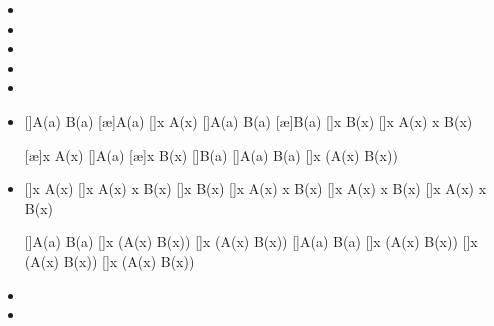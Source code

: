 \begin{itemize}
\item

\item

\item

\item

\item

\item
  \begin{prooftree*}
  [\une]{A(a) \land B(a)}
  [\ae]{A(a)}
  [\uni]{\forall x A(x)}
  [\une]{A(a) \land B(a)}
  [\ae]{B(a)}
  [\uni]{\forall x B(x)}
  [\ai]{\forall x A(x) \land \forall x B(x)}
  \end{prooftree*}

  \begin{prooftree*}
  [\ae]{\forall x A(x)}
  [\une]{A(a)}
  [\ae]{\forall x B(x)}
  [\une]{B(a)}
  [\ai]{A(a) \land B(a)}
  [\uni]{\forall x (A(x) \land B(x))}
  \end{prooftree*}

\item
  \begin{prooftree*}
  [\exi]{\exists x A(x)}
  [\di]{\exists x A(x) \lor \exists x B(x)}
  [\exi]{\exists x B(x)}
  [\di]{\exists x A(x) \lor \exists x B(x)}
  []{\exists x A(x) \lor \exists x B(x)}
  []{\exists x A(x) \lor \exists x B(x)}
  \end{prooftree*}

  \begin{prooftree*}
  [\di]{A(a) \lor B(a)}
  [\exi]{\exists x (A(x) \lor B(x))}
  []{\exists x (A(x) \lor B(x))}
  [\di]{A(a) \lor B(a)}
  [\exi]{\exists x (A(x) \lor B(x))}
  []{\exists x (A(x) \lor B(x))}
  []{\exists x (A(x) \lor B(x))}
  \end{prooftree*}

\item

\item

\end{itemize}